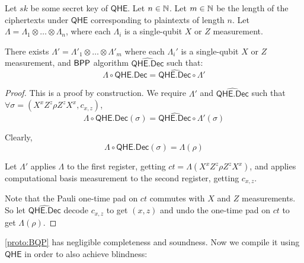 \begin{thm}
	\label{decodeMeasureOrder}
	Let $sk$ be some secret key of $\mathsf{QHE}$.
	Let $n\in\mathbb{N}$.
	Let $m\in\mathbb{N}$ be the length of the ciphertexts under $\mathsf{QHE}$ corresponding to plaintexts of length $n$.
	Let $\Lambda=\Lambda_1\otimes\ldots\otimes\Lambda_n$, where each $\Lambda_i$ is a single-qubit $X$ or $Z$ measurement.

	There exists $\Lambda'=\Lambda'_1\otimes\ldots\otimes\Lambda'_m$ where each $\Lambda_i'$ is a single-qubit $X$ or $Z$ measurement, and $\operatorname{\mathsf{BPP}}$ algorithm $\widehat{\mathsf{QHE.Dec}}$ such that:
	$$\Lambda\circ\mathsf{QHE.Dec}=\widehat{\mathsf{QHE.Dec}}\circ\Lambda'$$
\end{thm}
\begin{proof}
	This is a proof by construction.
	We require $\Lambda'$ and $\widehat{\mathsf{QHE.Dec}}$ such that $\forall\sigma=(X^xZ^z\rho Z^zX^x, c_{x,z})$,
	$$\Lambda\circ\mathsf{QHE.Dec}(\sigma)=\widehat{\mathsf{QHE.Dec}}\circ\Lambda'(\sigma)$$

	Clearly,
	$$\Lambda\circ\mathsf{QHE.Dec}(\sigma)=\Lambda(\rho)$$
	
	Let $\Lambda'$ applies $\Lambda$ to the first register, getting $ct=\Lambda(X^xZ^z\rho Z^zX^x)$, and applies computational basis measurement to the second register, getting $c_{x, z}$.

	Note that the Pauli one-time pad on $ct$ commutes with $X$ and $Z$ measurements.
	So let $\widehat{\mathsf{QHE.Dec}}$ decode $c_{x, z}$ to get $(x, z)$ and undo the one-time pad on $ct$ to get $\Lambda(\rho)$.
\end{proof}

\cref{proto:BQP} has negligible completeness and soundness.
Now we compile it using $\mathsf{QHE}$ in order to also achieve blindness:

